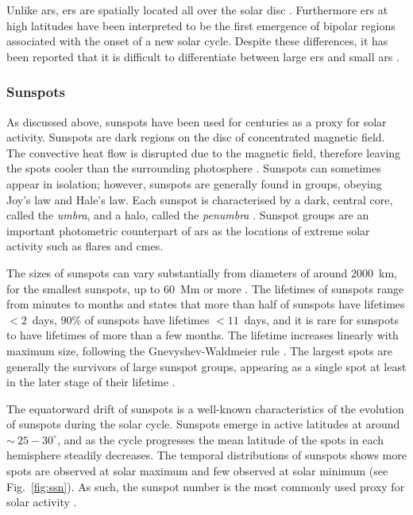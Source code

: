 Unlike \glspl{ar}, \glspl{er} are spatially located all over the solar disc \citep{harvey_solar_2001}. Furthermore \glspl{er} at high latitudes have been interpreted to be the first emergence of bipolar regions associated with the onset of a new solar cycle. Despite these differences, it has been reported that it is difficult to differentiate between large \glspl{er} and small \glspl{ar} \citep{harvey_solar_2001}.



\subsubsection*{Sunspots}

As discussed above, sunspots have been used for centuries as a proxy for solar activity. Sunspots are dark regions on the disc of concentrated magnetic field. The convective heat flow is disrupted due to the magnetic field, therefore leaving the spots cooler than the surrounding photosphere \citep{solanki_sunspots_2003, hathaway_solar_2015}. Sunspots can sometimes appear in isolation; however, sunspots are generally found in groups, obeying Joy's law and Hale's law. Each sunspot
is characterised by a dark, central core, called the \textit{umbra}, and a halo, called the \textit{penumbra} \citep{howard_sunspot_2001, solanki_sunspots_2003}. Sunspot groups are an important photometric counterpart of \glspl{ar} as the locations of extreme solar activity such as flares and \glspl{cme}.

The sizes of sunspots can vary substantially from diameters of around 2000~km, for the smallest sunspots, up to 60~Mm or more \citep{howard_sunspot_2001,solanki_sunspots_2003}. The lifetimes of sunspots range from minutes to months \citep{howard_sunspot_2001, solanki_sunspots_2003} and \citet{howard_sunspot_2001} states that more than half of sunspots have lifetimes $<2$~days, $90\%$ of sunspots have lifetimes $<11$~days, and it is rare for sunspots to have lifetimes of more than a few months. The lifetime increases linearly with maximum size, following the Gnevyshev-Waldmeier rule \citep{gnevyshev_notitle_1938, waldmeier_ergebnisse_1955}. The largest spots are generally the survivors of large sunspot groups, appearing as a single spot at least in the later stage of their lifetime \citep{howard_sunspot_2001}.

The equatorward drift of sunspots is a well-known characteristics of the evolution of sunspots during the solar cycle. Sunspots emerge in active latitudes at around $\sim~25-30^{\circ}$, and as the cycle progresses the mean latitude of the spots in each hemisphere steadily decreases. The temporal distributions of sunspots shows more spots are observed at solar maximum and few observed at solar minimum (see Fig.~\ref{fig:ssn}). As such, the sunspot number is the most commonly used proxy for solar activity \citep{hathaway_solar_2015}.

